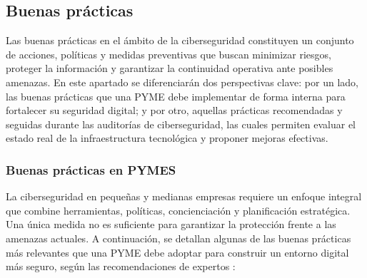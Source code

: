 \documentclass[a4paper, 10pt]{article}
\begin{document}
\subsection{Buenas prácticas}
Las buenas prácticas en el ámbito de la ciberseguridad constituyen un conjunto de acciones, políticas y medidas preventivas que buscan minimizar riesgos, proteger la información y garantizar la continuidad operativa ante posibles amenazas. En este apartado se diferenciarán dos perspectivas clave: por un lado, las buenas prácticas que una PYME debe implementar de forma interna para fortalecer su seguridad digital; y por otro, aquellas prácticas recomendadas y seguidas durante las auditorías de ciberseguridad, las cuales permiten evaluar el estado real de la infraestructura tecnológica y proponer mejoras efectivas.

\subsubsection{Buenas prácticas en PYMES}

La ciberseguridad en pequeñas y medianas empresas requiere un enfoque integral que combine herramientas, políticas, concienciación y planificación estratégica. Una única medida no es suficiente para garantizar la protección frente a las amenazas actuales. A continuación, se detallan algunas de las buenas prácticas más relevantes que una PYME debe adoptar para construir un entorno digital más seguro, según las recomendaciones de expertos \cite{toms2021}:
\end{document}
